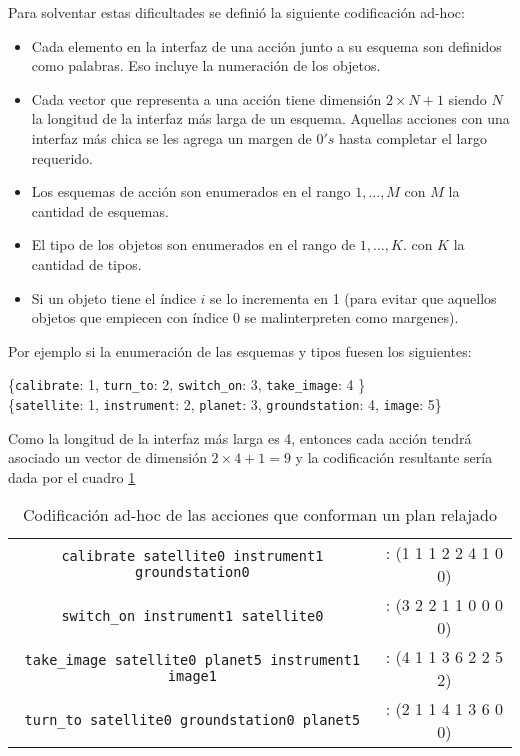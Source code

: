 Para solventar estas dificultades se definió la siguiente codificación ad-hoc:

\begin{itemize}
    \item Cada elemento en la interfaz de una acción junto a su esquema son
    definidos como palabras. Eso incluye la numeración de los objetos.
    \item Cada vector que representa a una acción tiene dimensión $2 \times N +
    1$ siendo $N$ la longitud de la interfaz más larga de un esquema. Aquellas
    acciones con una interfaz más chica se les agrega un margen de $0's$ hasta
    completar el largo requerido.
    \item Los esquemas de acción son enumerados en el rango $1, ..., M$ con $M$
    la cantidad de esquemas.
    \item El tipo de los objetos son enumerados en el rango de $1, ..., K$. con
    $K$ la cantidad de tipos.
    \item Si un objeto tiene el índice $i$ se lo incrementa en 1 (para evitar que
    aquellos objetos que empiecen con índice 0 se malinterpreten como margenes).
\end{itemize}

Por ejemplo si la enumeración de las esquemas y tipos fuesen los siguientes:

\begin{center}
    \{\verb|calibrate|: 1, \verb|turn_to|: 2, \verb|switch_on|: 3, \verb|take_image|: 4 \} \\
    \{\verb|satellite|: 1, \verb|instrument|: 2, \verb|planet|: 3, \verb|groundstation|: 4, \verb|image|: 5\}
\end{center}

Como la longitud de la interfaz más larga es 4, entonces cada acción tendrá
asociado un vector de dimensión $2 \times 4 + 1 = 9$ y la codificación
resultante sería dada por el cuadro \ref{tab:ohe_plan}

\begin{table}[h!]
    \centering
    \begin{tabular}{c|c}
        \verb|calibrate satellite0 instrument1 groundstation0| &: (1 1 1 2 2 4 1 0 0) \\
        \verb|switch_on instrument1 satellite0| &: (3 2 2 1 1 0 0 0 0) \\
        \verb|take_image satellite0 planet5 instrument1 image1| &: (4 1 1 3 6 2 2 5 2) \\
        \verb|turn_to satellite0 groundstation0 planet5| &: (2 1 1 4 1 3 6 0 0) \\
    \end{tabular}
    \caption{Codificación ad-hoc de las acciones que conforman un plan relajado}
    \label{tab:ohe_plan}
\end{table}

